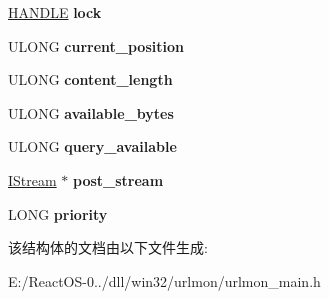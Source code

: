 \begin{DoxyCompactItemize}
\hyperlink{interfacevoid}{H\+A\+N\+D\+LE} {\bfseries lock}
\item 
\mbox{\label{struct_protocol_ae5f8bcb82e76faee46e432e891142708}} 
U\+L\+O\+NG {\bfseries current\+\_\+position}
\item 
\mbox{\label{struct_protocol_a5a22c7dd64095003099868ba1d32c5c0}} 
U\+L\+O\+NG {\bfseries content\+\_\+length}
\item 
\mbox{\label{struct_protocol_a95337be814240f8919a20fb7b21a2a93}} 
U\+L\+O\+NG {\bfseries available\+\_\+bytes}
\item 
\mbox{\label{struct_protocol_a887515faed7e7b54bda8e82328d9a29d}} 
U\+L\+O\+NG {\bfseries query\+\_\+available}
\item 
\mbox{\label{struct_protocol_a40074e923645ed1d1d266ea0d347c3a9}} 
\hyperlink{interface_i_stream}{I\+Stream} $\ast$ {\bfseries post\+\_\+stream}
\item 
\mbox{\label{struct_protocol_ad23b73cc9d363fbdd04da763386d19f6}} 
L\+O\+NG {\bfseries priority}
\end{DoxyCompactItemize}


该结构体的文档由以下文件生成\+:\begin{DoxyCompactItemize}
\item 
E\+:/\+React\+O\+S-\/0../dll/win32/urlmon/urlmon\+\_\+main.\+h\end{DoxyCompactItemize}
